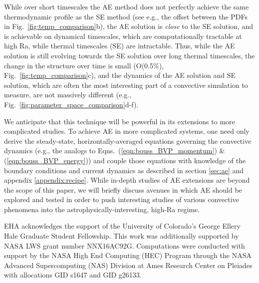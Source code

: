 \documentclass[aps, pre, onecolumn, nofootinbib, notitlepage, groupedaddress, amsfonts, amssymb, amsmath, longbibliography]{revtex4-1}
\begin{document}
While over short timescales the AE method does not perfectly achieve the same
thermodynamic profile as the SE method (see e.g., the offset between the PDFs
in Fig.~\ref{fig:temp_comparison}b), the AE solution is \emph{close} to the SE
solution, and is achievable on dynamical timescales, which are computationally
tractable at high Ra, while thermal timescales (SE) are intractable. Thus,
while the AE solution is still evolving towards the SE solution over long thermal
timescales, the change in the structure over time is small 
(O(0.5\%), Fig.~\ref{fig:temp_comparison}c), and the dynamics of the AE solution 
and SE solution, which are often the most interesting part of a 
convective simulation to measure, are not massively different (e.g., 
Fig.~\ref{fig:parameter_space_comparison}d-f).

We anticipate that
this technique will be powerful in its extensions to more complicated studies.
To achieve AE in more complicated systems, one need only derive 
the steady-state, horizontally-averaged equations governing
the convective dynamics
(e.g., the analogs to Eqns.~(\ref{eqn:bouss_BVP_momentum}) \& (\ref{eqn:bouss_BVP_energy}))
and couple those equations with knowledge of the boundary conditions
and current dynamics as described in
section \ref{sec:ae} and appendix \ref{appendix:recipe}.
While in-depth studies of AE extensions are beyond the 
scope of this paper, we will briefly discuss
avenues in which AE should be explored and tested in order
to push interesting studies of various convective phenomena into
the astrophysically-interesting, high-Ra regime.


\begin{acknowledgments}
EHA acknowledges the support of the University of Colorado's George 
Ellery Hale Graduate Student Fellowship.
This work was additionally supported by  NASA LWS grant number NNX16AC92G.  
Computations were conducted 
with support by the NASA High End Computing (HEC) Program through the NASA 
Advanced Supercomputing (NAS) Division at Ames Research Center on Pleiades
with allocations GID s1647 and GID g26133.
\end{acknowledgments}


\appendix
\end{document}
